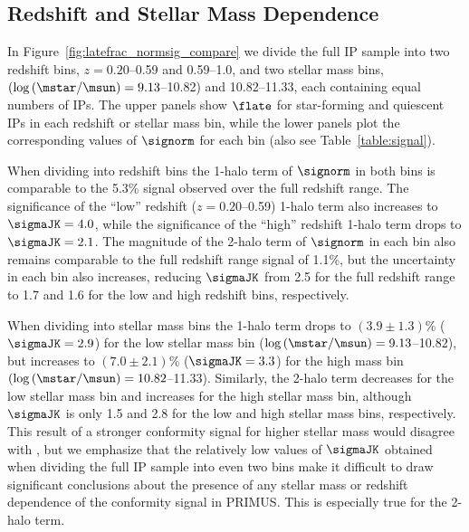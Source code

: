 

\subsection{Redshift and Stellar Mass Dependence}\label{sec:z_mass_bins}

In Figure~\ref{fig:latefrac_normsig_compare} we divide the full IP sample into two redshift bins, {$z=0.20$--0.59} and 0.59--1.0, and two stellar mass bins, 
{$(\log\,(\mstar/\msun)=9.13$--10.82)} and 10.82--11.33, each containing equal numbers of IPs.
The upper panels show $\flate$ for star-forming and quiescent IPs in each redshift or stellar mass bin, while the lower panels plot the corresponding values of
$\signorm$ for each bin (also see Table~\ref{table:signal}).

When dividing into redshift bins the 1-halo term of $\signorm$ in both bins is comparable to the 5.3\% signal observed over the full redshift range.
The significance of the ``low'' redshift {($z=0.20$--0.59)} 1-halo term also increases to {$\sigmaJK=4.0$}, while the significance of the ``high'' redshift 1-halo term drops to
{$\sigmaJK=2.1$}.
The magnitude of the 2-halo term of $\signorm$ in each bin also remains comparable to the full redshift range signal of 1.1\%, but the uncertainty in each bin also increases,
reducing $\sigmaJK$ from 2.5 for the full redshift range to 1.7 and 1.6 for the low and high redshift bins, respectively.

When dividing into stellar mass bins the 1-halo term drops to {$(3.9\pm1.3)$\%} ($\sigmaJK=2.9$) for the low stellar mass bin ({$\log\,(\mstar/\msun)=9.13$--10.82}), but
increases to {$(7.0\pm2.1)$\%} ($\sigmaJK=3.3$) for the high mass bin {$(\log\,(\mstar/\msun)=10.82$--11.33)}.
Similarly, the 2-halo term decreases for the low stellar mass bin and increases for the high stellar mass bin, although $\sigmaJK$ is only 1.5  and 2.8 for the low and high stellar
mass bins, respectively.  This result of a stronger conformity signal for higher stellar mass would disagree with , but we emphasize that the relatively low values of 
$\sigmaJK$ obtained when dividing the full IP sample into even two bins make it difficult to draw significant conclusions about the presence of any stellar mass or redshift
dependence of the conformity signal in PRIMUS.  This is especially true for the 2-halo term.

